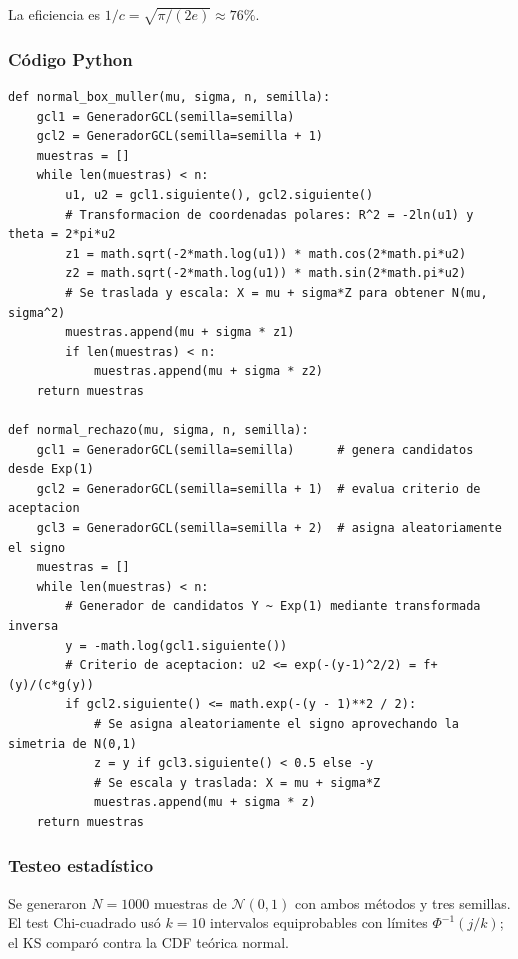 La eficiencia es $1/c = \sqrt{\pi/(2e)} \approx 76\%$.

\subsubsection{Código Python}

\begin{lstlisting}
def normal_box_muller(mu, sigma, n, semilla):
    gcl1 = GeneradorGCL(semilla=semilla)
    gcl2 = GeneradorGCL(semilla=semilla + 1)
    muestras = []
    while len(muestras) < n:
        u1, u2 = gcl1.siguiente(), gcl2.siguiente()
        # Transformacion de coordenadas polares: R^2 = -2ln(u1) y theta = 2*pi*u2
        z1 = math.sqrt(-2*math.log(u1)) * math.cos(2*math.pi*u2)
        z2 = math.sqrt(-2*math.log(u1)) * math.sin(2*math.pi*u2)
        # Se traslada y escala: X = mu + sigma*Z para obtener N(mu, sigma^2)
        muestras.append(mu + sigma * z1)
        if len(muestras) < n:
            muestras.append(mu + sigma * z2)
    return muestras

def normal_rechazo(mu, sigma, n, semilla):
    gcl1 = GeneradorGCL(semilla=semilla)      # genera candidatos desde Exp(1)
    gcl2 = GeneradorGCL(semilla=semilla + 1)  # evalua criterio de aceptacion
    gcl3 = GeneradorGCL(semilla=semilla + 2)  # asigna aleatoriamente el signo
    muestras = []
    while len(muestras) < n:
        # Generador de candidatos Y ~ Exp(1) mediante transformada inversa
        y = -math.log(gcl1.siguiente())
        # Criterio de aceptacion: u2 <= exp(-(y-1)^2/2) = f+(y)/(c*g(y))
        if gcl2.siguiente() <= math.exp(-(y - 1)**2 / 2):
            # Se asigna aleatoriamente el signo aprovechando la simetria de N(0,1)
            z = y if gcl3.siguiente() < 0.5 else -y
            # Se escala y traslada: X = mu + sigma*Z
            muestras.append(mu + sigma * z)
    return muestras
\end{lstlisting}

\subsubsection{Testeo estadístico}

Se generaron $N = 1000$ muestras de $\mathcal{N}(0,1)$ con ambos métodos y tres semillas.
El test Chi-cuadrado usó $k = 10$ intervalos equiprobables con límites $\Phi^{-1}(j/k)$;
el KS comparó contra la CDF teórica normal.


